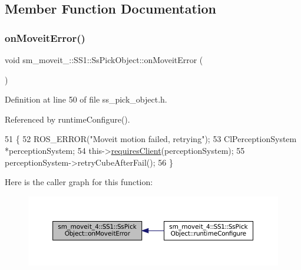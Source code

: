 \subsection{Member Function Documentation}
\mbox{\label{structsm__moveit__4_1_1SS1_1_1SsPickObject_a93785400a47ee6a1ad38d49b2a7a069b}} 
\subsubsection{\texorpdfstring{on\+Moveit\+Error()}{onMoveitError()}}
{\footnotesize\ttfamily void sm\+\_\+moveit\+\_\+::\+S\+S1\+::\+Ss\+Pick\+Object\+::on\+Moveit\+Error (\begin{DoxyParamCaption}{ }\end{DoxyParamCaption})\hspace{0.3cm}{\ttfamily [inline]}}



Definition at line 50 of file ss\+\_\+pick\+\_\+object.\+h.



Referenced by runtime\+Configure().


\begin{DoxyCode}
51     \{
52         ROS\_ERROR(\textcolor{stringliteral}{"Moveit motion failed, retrying"});
53         ClPerceptionSystem *perceptionSystem;
54         this->\hyperlink{classsmacc_1_1ISmaccState_a7f95c9f0a6ea2d6f18d1aec0519de4ac}{requiresClient}(perceptionSystem);
55         perceptionSystem->retryCubeAfterFail();
56     \}
\end{DoxyCode}
Here is the caller graph for this function\+:
\nopagebreak
\begin{figure}[H]
\begin{center}
\leavevmode
\includegraphics[width=350pt]{structsm__moveit__4_1_1SS1_1_1SsPickObject_a93785400a47ee6a1ad38d49b2a7a069b_icgraph}
\end{center}
\end{figure}
\mbox{\label{structsm__moveit__4_1_1SS1_1_1SsPickObject_a00ddf11db72eb417a0e4221426722c02}} 
